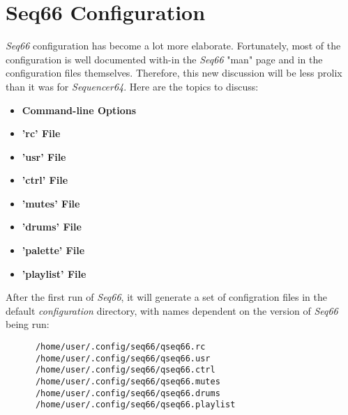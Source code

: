 %
%
%

\section{Seq66 Configuration}
\label{sec:configuration}

   \textsl{Seq66} configuration has become a lot more elaborate.
   Fortunately, most of the configuration is well documented with-in the
   \textsl{Seq66} "man" page and in the configuration files themselves.
   Therefore, this new discussion will be less prolix than it was for
   \textsl{Sequencer64}.  Here are the topics to discuss:

   \begin{itemize}
      \item \textbf{Command-line Options}
      \item \textbf{'rc' File}
      \item \textbf{'usr' File}
      \item \textbf{'ctrl' File}
      \item \textbf{'mutes' File}
      \item \textbf{'drums' File}
      \item \textbf{'palette' File}
      \item \textbf{'playlist' File}
   \end{itemize}

   After the first run of \textsl{Seq66},
   it will generate a set of configration files in the default
   \textsl{configuration} directory, with names dependent on the version of
   \textsl{Seq66} being run:

   \begin{verbatim}
      /home/user/.config/seq66/qseq66.rc
      /home/user/.config/seq66/qseq66.usr
      /home/user/.config/seq66/qseq66.ctrl
      /home/user/.config/seq66/qseq66.mutes
      /home/user/.config/seq66/qseq66.drums
      /home/user/.config/seq66/qseq66.playlist
   \end{verbatim}

